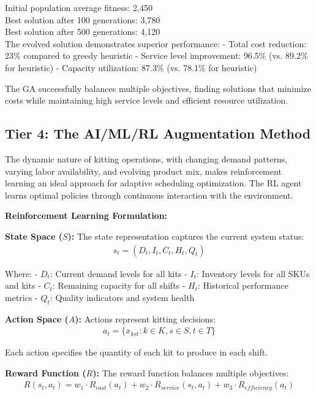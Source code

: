 \documentclass{article}
\begin{document}
Initial population average fitness: 2,450\\
Best solution after 100 generations: 3,780\\
Best solution after 500 generations: 4,120\\

The evolved solution demonstrates superior performance:
- Total cost reduction: 23\% compared to greedy heuristic
- Service level improvement: 96.5\% (vs. 89.2\% for heuristic)
- Capacity utilization: 87.3\% (vs. 78.1\% for heuristic)

The GA successfully balances multiple objectives, finding solutions that minimize costs while maintaining high service levels and efficient resource utilization.

\subsection{Tier 4: The AI/ML/RL Augmentation Method}

The dynamic nature of kitting operations, with changing demand patterns, varying labor availability, and evolving product mix, makes reinforcement learning an ideal approach for adaptive scheduling optimization. The RL agent learns optimal policies through continuous interaction with the environment.

\textbf{Reinforcement Learning Formulation:}

\textbf{State Space ($S$):}
The state representation captures the current system status:
\begin{align}
s_t = (D_t, I_t, C_t, H_t, Q_t)
\end{align}

Where:
- $D_t$: Current demand levels for all kits
- $I_t$: Inventory levels for all SKUs and kits  
- $C_t$: Remaining capacity for all shifts
- $H_t$: Historical performance metrics
- $Q_t$: Quality indicators and system health

\textbf{Action Space ($A$):}
Actions represent kitting decisions:
\begin{align}
a_t = \{x_{kst} : k \in K, s \in S, t \in T\}
\end{align}

Each action specifies the quantity of each kit to produce in each shift.

\textbf{Reward Function ($R$):}
The reward function balances multiple objectives:
\begin{align}
R(s_t, a_t) = w_1 \cdot R_{cost}(a_t) + w_2 \cdot R_{service}(s_t, a_t) + w_3 \cdot R_{efficiency}(a_t)
\end{align}
\end{document}
